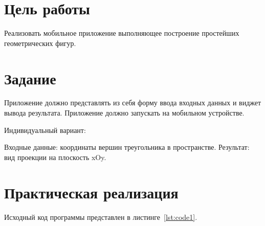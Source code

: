 \documentclass[a4paper, 14pt]{extarticle}
\begin{document}
\renewcommand{\ttdefault}{pcr}

\setlength{\tabcolsep}{3pt}
\newpage
\setcounter{page}{2}

\section{Цель работы}\label{Sect::goal}

Реализовать мобильное приложение выполняющее построение простейших геометрических фигур.

\section{Задание}\label{Sect::task}

Приложение должно представлять из себя форму ввода входных данных и
виджет вывода результата. Приложение должно запускать на мобильном
устройстве.

Индивидуальный вариант:

Входные данные: координаты вершин треугольника в пространстве. Результат: вид проекции на плоскость xOy.

\section{Практическая реализация}\label{Sect::code}

Исходный код программы представлен в листинге~\ref{lst:code1}.
\end{document}
